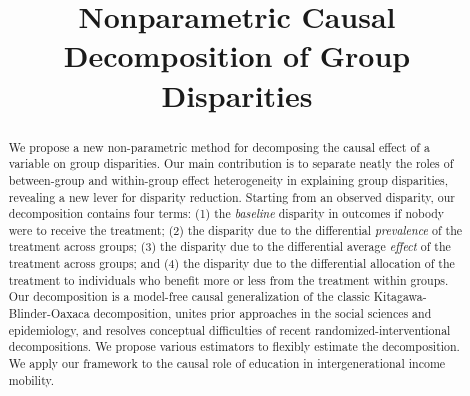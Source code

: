 \documentclass[aoas]{imsart}
\begin{document}
\begin{frontmatter}
\title{Nonparametric Causal Decomposition of Group Disparities}


\begin{abstract}
We propose a new non-parametric method for decomposing the causal effect of a variable on group disparities. Our main contribution is to separate neatly the roles of between-group and within-group effect heterogeneity in explaining group disparities, revealing a new lever for disparity reduction. Starting from an observed disparity, our decomposition contains four terms: (1) the \emph{baseline} disparity in outcomes if nobody were to receive the treatment; (2) the disparity due to the differential \emph{prevalence} of the treatment across groups; (3) the disparity due to the differential average \emph{effect} of the treatment across groups; and (4) the disparity due to the differential allocation of the treatment to individuals who benefit more or less from the treatment within groups. Our decomposition is a model-free causal generalization of the classic Kitagawa-Blinder-Oaxaca decomposition, unites prior approaches in the social sciences and epidemiology, and resolves conceptual difficulties of recent randomized-interventional decompositions. We propose various estimators to flexibly estimate the decomposition. We apply our framework to the causal role of education in intergenerational income mobility. 
\end{abstract}

\begin{keyword}
\end{keyword}

\end{frontmatter}
\end{document}
